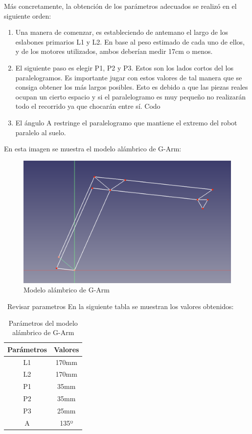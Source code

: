 \newpage
Más concretamente, la obtención de los parámetros adecuados se realizó en el siguiente orden:
\begin{enumerate}
\item Una manera de comenzar, es estableciendo de antemano el largo de los eslabones primarios L1 y L2. En base al peso estimado de 
cada uno de ellos, y de los motores utilizados, ambos deberían medir 17cm o menos.
\item El siguiente paso es elegir P1, P2 y P3. Estos son los lados cortos del los paralelogramos. Es importante jugar con estos valores 
de tal manera que se consiga obtener los más largos posibles. Esto es debido a que las piezas reales ocupan un cierto espacio y si el paralelogramo es 
muy pequeño no realizarán todo el recorrido ya que chocarán entre sí. Codo
\item El ángulo A restringe el paralelogramo que mantiene el extremo del robot paralelo al suelo.   
\end{enumerate}
En esta imagen se muestra el modelo alámbrico de G-Arm:\\
\begin{figure} [ht!]
  \begin{center}
    \includegraphics[width=15cm]{figs/alambrico_garm.png}
  \end{center}
  \caption{Modelo alámbrico de G-Arm}
  \label{fig:mod_pinza_figure}
\end{figure}\ 
Revisar parametros
\newpage
En la siguiente tabla se muestran los valores obtenidos: 
\begin{table}[H]
\begin{center}
\begin{tabular}{|c|c|}
\hline
\textbf{Parámetros} & \textbf{Valores} \\
\hline
L1 & 170mm \\
L2 & 170mm \\
P1 & 35mm \\
P2 & 35mm \\
P3 & 25mm \\
A & 135º \\
\hline
\end{tabular}
\caption{Parámetros del modelo alámbrico de G-Arm}
\label{cuadro:parametros_alambrico}
\end{center}
\end{table}

